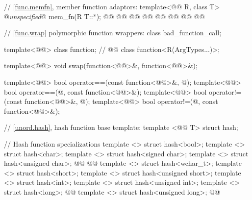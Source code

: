 \documentclass[american,twoside]{book}
\begin{document}
\begin{codeblock}
{  // \marktr{}\ref{func.memfn}, member function adaptors:
  template<@@ R, class T> @\textit{unspecified}@ mem_fn(R T::*);
  @@
    @@
  @@
    @@
  @@
    @@
  @@
    @@

  // \marktr{}\ref{func.wrap} polymorphic function wrappers:
  class bad_function_call;

  template<@@> class function; // 
  @@
    class function<R(ArgTypes...)>;

  template<@@>
    void swap(function<@@>&, function<@@>&);

  template<@@>
    bool operator==(const function<@@>&, @\unspecnull@);
  template<@@>
    bool operator==(@\unspecnull@, const function<@@>&);
  template<@@>
    bool operator!=(const function<@@>&, @\unspecnull@);
  template<@@>
    bool operator!=(@\unspecnull@, const function<@@>&);

  // \marktr{}\ref{unord.hash}, hash function base template:
  template <@@ T> struct hash;

  // Hash function specializations
  template <> struct hash<bool>;
  template <> struct hash<char>;
  template <> struct hash<signed char>;
  template <> struct hash<unsigned char>;
  @@
  @@
  template <> struct hash<wchar_t>;
  template <> struct hash<short>;
  template <> struct hash<unsigned short>;
  template <> struct hash<int>;
  template <> struct hash<unsigned int>;
  template <> struct hash<long>;
  @@
  template <> struct hash<unsigned long>;
  @@

}
\end{codeblock}
\end{document}
